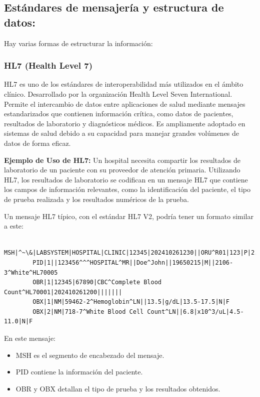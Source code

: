 \documentclass[12pt, a4paper, twoside]{article}
\begin{document}
	
	\subsection{Estándares de mensajería y estructura de datos:}
	
	Hay varias formas de estructurar la información:
	
	\subsubsection{HL7 (Health Level 7)} 
	HL7 es uno de los estándares de interoperabilidad más utilizados en el ámbito clínico. Desarrollado por la organización Health Level Seven International. Permite el intercambio de datos entre aplicaciones de salud mediante mensajes estandarizados que contienen información crítica, como datos de pacientes, resultados de laboratorio y diagnósticos médicos. Es ampliamente adoptado en sistemas de salud debido a su capacidad para manejar grandes volúmenes de datos de forma eficaz. 
	\vspace{5cm}
	
	\textbf{Ejemplo de Uso de HL7:} Un hospital necesita compartir los resultados de laboratorio de un paciente con su proveedor de atención primaria. Utilizando HL7, los resultados de laboratorio se codifican en un mensaje HL7 que contiene los campos de información relevantes, como la identificación del paciente, el tipo de prueba realizada y los resultados numéricos de la prueba.
	
	Un mensaje HL7 típico, con el estándar HL7 V2, podría tener un formato similar a este\cite{meditecsHL7}:
	
	\begin{verbatim}
		MSH|^~\&|LABSYSTEM|HOSPITAL|CLINIC|12345|202410261230||ORU^R01|123|P|2.3
		PID|1||123456^^^HOSPITAL^MR||Doe^John||19650215|M||2106-3^White^HL70005
		OBR|1|12345|67890|CBC^Complete Blood Count^HL70001|202410261200|||||||
		OBX|1|NM|59462-2^Hemoglobin^LN||13.5|g/dL|13.5-17.5|N|F
		OBX|2|NM|718-7^White Blood Cell Count^LN||6.8|x10^3/uL|4.5-11.0|N|F
	\end{verbatim}
	
	
	
	En este mensaje:
	\begin{itemize}
		\item MSH es el segmento de encabezado del mensaje.
		\item PID contiene la información del paciente.
		\item OBR y OBX detallan el tipo de prueba y los resultados obtenidos.
	\end{itemize}
	
\end{document}
